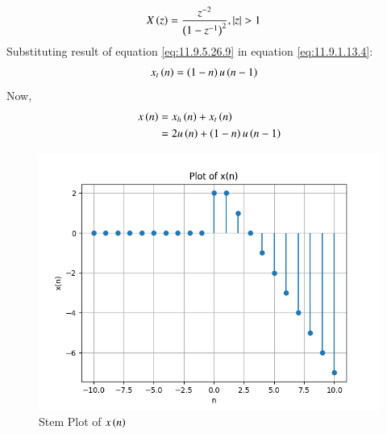 \documentclass[journal,12pt,twocolumn]{IEEEtran}
\theoremstyle{remark}
\begin{document}
\begin{align}
    X\left(z\right) &= \frac{z^{-2}}{\left(1-z^{-1}\right)^2}  ,   \left\vert z\right\vert >1\label{eq:11.9.1.13.4}
\end{align}
Substituting result of equation \eqref{eq:11.9.5.26.9}  in equation \eqref{eq:11.9.1.13.4}:
\begin{align}
    x_t\left(n\right) &= \left(1-n\right)u\left(n-1\right)
\end{align}
Now,
\begin{align}
    x\left(n\right) &= x_h\left(n\right) + x_t\left(n\right) \\
                &= 2u\left(n\right) + \left(1-n\right)u\left(n-1\right)
\end{align} 
\begin{figure}[htbp]
    \centering
    \includegraphics[width=1\columnwidth]{figs/fig_x(n).png}
    \caption{Stem Plot of $x\left(n\right)$}
    \label{fig:x(n)}
\end{figure}
\end{document}

